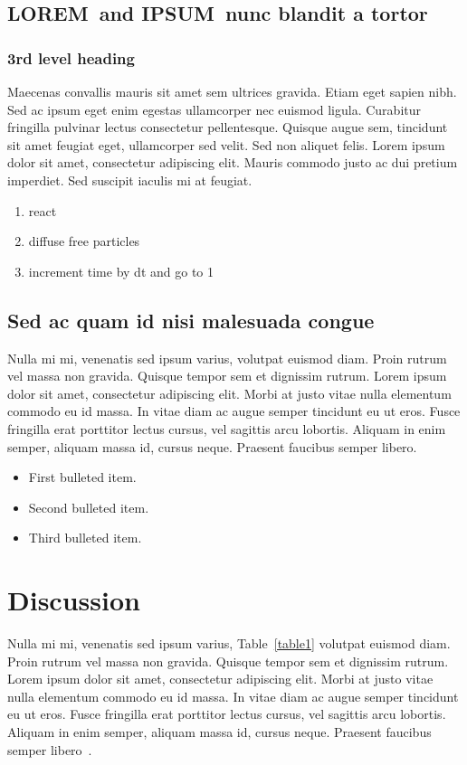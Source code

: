 \documentclass[10pt,letterpaper]{article}
\newcommand{\lorem}{{\bf LOREM}}
\newcommand{\ipsum}{{\bf IPSUM}}
\begin{document}
\subsection*{\lorem\ and \ipsum\ nunc blandit a tortor}
\subsubsection*{3rd level heading} 
Maecenas convallis mauris sit amet sem ultrices gravida. Etiam eget sapien nibh. Sed ac ipsum eget enim egestas ullamcorper nec euismod ligula. Curabitur fringilla pulvinar lectus consectetur pellentesque. Quisque augue sem, tincidunt sit amet feugiat eget, ullamcorper sed velit. Sed non aliquet felis. Lorem ipsum dolor sit amet, consectetur adipiscing elit. Mauris commodo justo ac dui pretium imperdiet. Sed suscipit iaculis mi at feugiat. 

\begin{enumerate}
	\item{react}
	\item{diffuse free particles}
	\item{increment time by dt and go to 1}
\end{enumerate}


\subsection*{Sed ac quam id nisi malesuada congue}

Nulla mi mi, venenatis sed ipsum varius, volutpat euismod diam. Proin rutrum vel massa non gravida. Quisque tempor sem et dignissim rutrum. Lorem ipsum dolor sit amet, consectetur adipiscing elit. Morbi at justo vitae nulla elementum commodo eu id massa. In vitae diam ac augue semper tincidunt eu ut eros. Fusce fringilla erat porttitor lectus cursus, vel sagittis arcu lobortis. Aliquam in enim semper, aliquam massa id, cursus neque. Praesent faucibus semper libero.

\begin{itemize}
	\item First bulleted item.
	\item Second bulleted item.
	\item Third bulleted item.
\end{itemize}

\section*{Discussion}
Nulla mi mi, venenatis sed ipsum varius, Table~\ref{table1} volutpat euismod diam. Proin rutrum vel massa non gravida. Quisque tempor sem et dignissim rutrum. Lorem ipsum dolor sit amet, consectetur adipiscing elit. Morbi at justo vitae nulla elementum commodo eu id massa. In vitae diam ac augue semper tincidunt eu ut eros. Fusce fringilla erat porttitor lectus cursus, vel sagittis arcu lobortis. Aliquam in enim semper, aliquam massa id, cursus neque. Praesent faucibus semper libero~\cite{bib3}.
\end{document}
